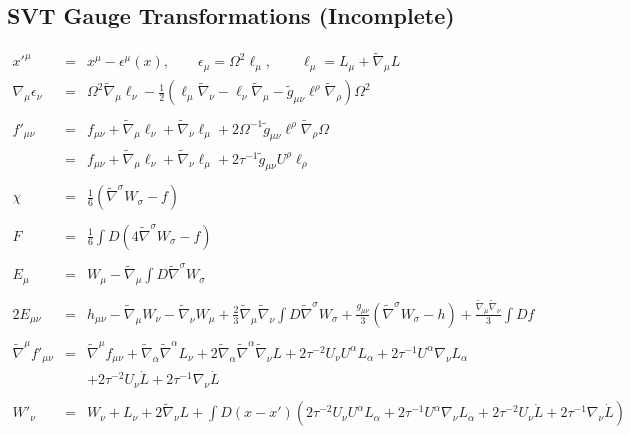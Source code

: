 \documentclass[10pt,letterpaper]{article}
\numberwithin{equation}{section}
\begin{document}
\begin{appendices}
\section{SVT Gauge Transformations (Incomplete)}
\begin{eqnarray}
x'^\mu &=& x^\mu - \epsilon^\mu(x),\qquad \epsilon_\mu = \Omega^2\ell_\mu,\qquad \ell_\mu = L_\mu + \tilde\nabla_\mu L
\\ \nonumber
\nabla_\mu \epsilon_\nu &=& \Omega^2 \tilde\nabla_\mu \ell_\nu - \frac12 \left(
\ell_\mu \tilde\nabla_\nu - \ell_\nu \tilde\nabla_\mu - \tilde g_{\mu\nu} \ell^\rho \tilde\nabla_\rho\right)\Omega^2
\\ \nonumber\\
f'_{\mu\nu} &=& f_{\mu\nu} + \tilde\nabla_\mu \ell_\nu +\tilde\nabla_\nu \ell_\mu + 2\Omega^{-1} \tilde g_{\mu\nu} \ell^\rho \tilde\nabla_\rho \Omega
\nonumber\\
&=& f_{\mu\nu} + \tilde\nabla_\mu \ell_\nu +\tilde\nabla_\nu \ell_\mu + 2\tau^{-1} \tilde g_{\mu\nu}U^\rho \ell_\rho
\\ \nonumber\\
\chi &=& \frac{1}{6} \left( \tilde\nabla^\sigma W_\sigma - f\right)
\\ \nonumber\\
F &=& \frac{1}{6} \int D(4\tilde\nabla^\sigma W_\sigma -f)
\\ \nonumber\\
E_\mu &=& W_\mu -\tilde\nabla_\mu \int D \tilde\nabla^\sigma W_\sigma
\\ \nonumber\\
2E_{\mu\nu} &=& h_{\mu\nu} - \tilde\nabla_\mu W_\nu -\tilde\nabla_\nu W_\mu + \frac23 \tilde\nabla_\mu\tilde\nabla_\nu \int D \tilde\nabla^\sigma W_\sigma
+\frac{g_{\mu\nu}}{3} (\tilde\nabla^\sigma W_\sigma -h) + \frac{\tilde\nabla_\mu\tilde\nabla_\nu}{3}\int D f 
\\ \nonumber\\ 
\tilde\nabla^\mu f'_{\mu\nu} &=& \tilde\nabla^\mu f_{\mu\nu} + \tilde\nabla_\alpha\tilde\nabla^\alpha L_\nu + 2\tilde\nabla_\alpha\tilde\nabla^\alpha \tilde\nabla_\nu L +
2  \tau^{-2}  U_{\nu}U^{\alpha}L_\alpha + 2 \tau^{-1} U^{\alpha}\nabla_{\nu}L_{\alpha}
\nonumber\\
&&+  2  \tau^{-2}  U_{\nu}\dot L + 2 \tau^{-1}\nabla_{\nu}\dot L
\\ \nonumber\\
W'_\nu &=& W_\nu +L_\nu + 2\tilde\nabla_\nu L + \int D(x-x') (2  \tau^{-2}  U_{\nu}U^{\alpha}L_\alpha + 2 \tau^{-1} U^{\alpha}\nabla_{\nu}L_{\alpha}+ 2  \tau^{-2}  U_{\nu}\dot L + 2 \tau^{-1}\nabla_{\nu}\dot L)
\end{eqnarray}
\end{appendices}
\end{document}
